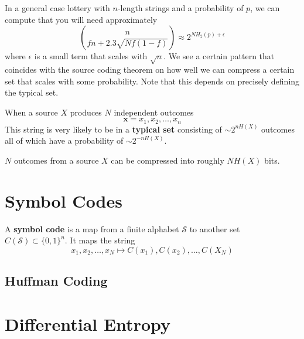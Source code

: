 \documentclass{article}
\begin{document}
    In a general case lottery with $n$-length strings and a probability of $p$, we can compute that you will need approximately 
    \begin{equation}
      \binom{n}{f n + 2.3 \sqrt{N f (1 - f)}} \approx 2^{N H_2 (p) + \epsilon} 
    \end{equation}
    where $\epsilon$ is a small term that scales with $\sqrt{n}$. We see a certain pattern that coincides with the source coding theorem on how well we can compress a certain set that scales with some probability. Note that this depends on precisely defining the typical set. 

    \begin{definition}
      When a source $X$ produces $N$ independent outcomes 
      \begin{equation}
        \mathbf{x} = x_1, x_2, \ldots, x_n
      \end{equation}
      This string is very likely to be in a \textbf{typical set} consisting of $\sim 2^{n H(X)}$ outcomes all of which have a probability of $\sim 2^{-n H(X)}$. 
    \end{definition}

    \begin{theorem}
      $N$ outcomes from a source $X$ can be compressed into roughly $N H(X)$ bits. 
    \end{theorem}

\section{Symbol Codes}

  \begin{definition}
    A \textbf{symbol code} is a map from a finite alphabet $\mathcal{S}$ to another set $C(\mathcal{S}) \subset \{0, 1\}^n$. It maps the string 
    \begin{equation}
      x_1, x_2, \ldots, x_N \mapsto C(x_1), C(x_2), \ldots, C(X_N)
    \end{equation}
  \end{definition}

  \subsection{Huffman Coding}

\section{Differential Entropy}
\end{document}
